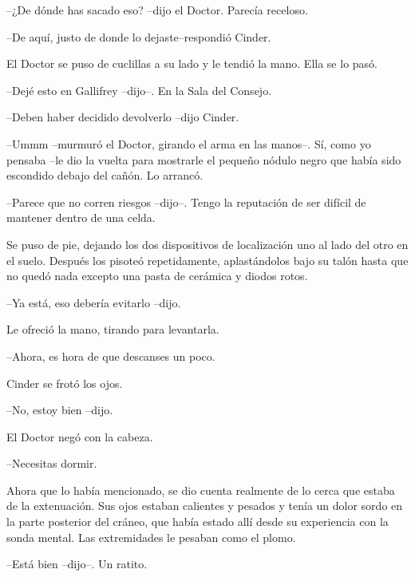 --¿De dónde has sacado eso? --dijo el Doctor. Parecía receloso.

--De aquí, justo de donde lo dejaste--respondió Cinder.



El Doctor se puso de cuclillas a su lado y le tendió la mano. Ella se lo pasó. 



--Dejé esto en Gallifrey --dijo--. En la Sala del Consejo.

--Deben haber decidido devolverlo --dijo Cinder.

--Ummm --murmuró el Doctor, girando el arma en las manos--. Sí, como yo pensaba --le dio la vuelta para mostrarle el pequeño nódulo negro que había sido escondido debajo del cañón. Lo arrancó.

--Parece que no corren riesgos --dijo--. Tengo la reputación de ser difícil de mantener dentro de una celda.



Se puso de pie, dejando los dos dispositivos de localización uno al lado del otro en el suelo. Después los pisoteó repetidamente, aplastándolos bajo su talón hasta que no quedó nada excepto una pasta de cerámica y diodos rotos. 



--Ya está, eso debería evitarlo --dijo.



Le ofreció la mano, tirando para levantarla. 



--Ahora, es hora de que descanses un poco.



Cinder se frotó los ojos. 



--No, estoy bien --dijo.



El Doctor negó con la cabeza. 



--Necesitas dormir.



Ahora que lo había mencionado, se dio cuenta realmente de lo cerca que estaba de la extenuación. Sus ojos estaban calientes y pesados y tenía un dolor sordo en la parte posterior del cráneo, que había estado allí desde su experiencia con la sonda mental. Las extremidades le pesaban como el plomo. 



--Está bien --dijo--. Un ratito.

